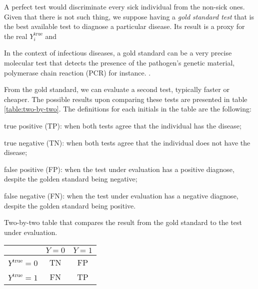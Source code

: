 A perfect test would discriminate every sick individual from the non-sick ones.
Given that there is not such thing, we suppose having a {\em gold standard
test} that is the best available test \cite{versi1992gold} to diagnose a
particular disease. Its result is a proxy for the real $Y^{\mathrm{true}}_i$ and 

\begin{citacao}
  In the context of infectious diseases, a gold standard can be a very precise
  molecular test that detects the presence of the pathogen’s genetic material,
  polymerase chain reaction (PCR) for instance. \cite[p. 125]{bastos2021modelling}.
\end{citacao}

From the gold standard, we can evaluate a second test, typically faster or
cheaper. The possible results upon comparing these tests are presented in
table \ref{table:two-by-two}. The definitions for each initials in the table
are the following: 

\begin{alineas}
  \item true positive (TP): when both tests agree that the individual has the
  disease;
  \item true negative (TN): when both tests agree that the individual does not
  have the disease;
  \item false positive (FP): when the test under evaluation has a positive
  diagnose, despite the golden standard being negative;
  \item false negative (FN): when the test under evaluation has a negative
  diagnose, despite the golden standard being positive.
\end{alineas}

\begin{quadro}[!ht]
  \centering
  \caption[Chart]{Two-by-two table that compares the result from the gold standard to
  the test under evaluation.}
  \begin{tabular}{c|c|c|}
  \cline{2-3}
                                               & $Y = 0$ & $Y = 1$ \\ \hline
  \multicolumn{1}{|c|}{$Y^{\mathrm{true}}= 0$} & TN    & FP    \\ \hline
  \multicolumn{1}{|c|}{ $Y^{\mathrm{true}}= 1$} & FN    & TP    \\ \hline
  \end{tabular}
  \label{table:two-by-two}
\end{quadro}

